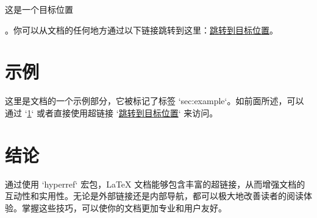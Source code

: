 \documentclass{article}
\begin{document}
\hypertarget{mytarget}{这是一个目标位置}。你可以从文档的任何地方通过以下链接跳转到这里：\hyperlink{mytarget}{跳转到目标位置}。

\section{示例}
\label{sec:example}
这里是文档的一个示例部分，它被标记了标签 `sec:example`。如前面所述，可以通过 `\ref{sec:example}` 或者直接使用超链接 `\hyperlink{mytarget}{跳转到目标位置}` 来访问。

\section{结论}
通过使用 `hyperref` 宏包，LaTeX 文档能够包含丰富的超链接，从而增强文档的互动性和实用性。无论是外部链接还是内部导航，都可以极大地改善读者的阅读体验。掌握这些技巧，可以使你的文档更加专业和用户友好。
\end{document}
